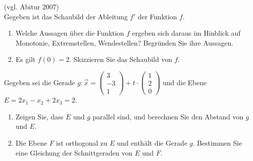  (vgl. Abitur 2007)\\
Gegeben ist das Schaubild der Ableitung $f'$ der Funktion $f$. 
\begin{enumerate}
  \item Welche Aussagen über die Funktion $f$ ergeben sich daraus im Hinblick auf Monotonie, Extremstellen, Wendestellen? Begründen Sie ihre Aussagen.

  \item Es gilt $f(0)=2$. Skizzieren Sie das Schaubild von $f$.
\end{enumerate}

\begin{lsg}{}
\end{lsg}

Gegeben sei die Gerade $g: \vec x=\left(\begin{array}{c} 3 \\ -3 \\ 1 \end{array}\right) + t\cdot \left( \begin{array}{c} 1 \\ 2 \\ 0 \end{array} \right)$ und die Ebene $E = 2x_1-x_2+2x_3=2$. 
\begin{enumerate}
  \item Zeigen Sie, dass $E$ und $g$ parallel sind, und berechnen Sie den Abstand von $g$ und $E$.
  \item Die Ebene $F$ ist orthogonal zu $E$ und enthält die Gerade $g$. Bestimmen Sie eine Gleichung der Schnittgeraden von $E$ und $F$.
\end{enumerate}
